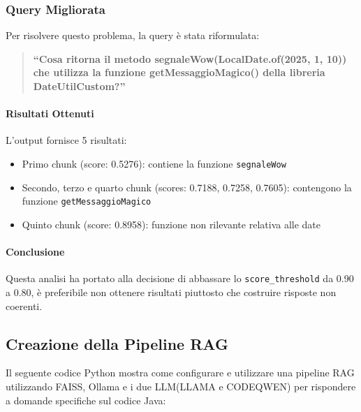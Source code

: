 \documentclass[12pt,a4paper,openright,twoside]{book}
\begin{document}
\subsubsection{Query Migliorata}
Per risolvere questo problema, la query è stata riformulata:
\begin{quote}
    \textbf{``Cosa ritorna il metodo segnaleWow(LocalDate.of(2025, 1, 10)) che utilizza la funzione getMessaggioMagico() della libreria DateUtilCustom?''}
\end{quote}

\paragraph{Risultati Ottenuti}
L'output fornisce 5 risultati:
\begin{itemize}
    \item Primo chunk (score: 0.5276): contiene la funzione \texttt{segnaleWow}
    \item Secondo, terzo e quarto chunk (scores: 0.7188, 0.7258, 0.7605): contengono la funzione \texttt{getMessaggioMagico}
    \item Quinto chunk (score: 0.8958): funzione non rilevante relativa alle date
\end{itemize}

\paragraph{Conclusione}
Questa analisi ha portato alla decisione di abbassare lo \texttt{score\_threshold} da 0.90 a 0.80,
è preferibile non ottenere risultati piuttosto che costruire risposte non coerenti.
 
\subsection{Creazione della Pipeline RAG}
Il seguente codice Python mostra come configurare e utilizzare una pipeline RAG utilizzando FAISS, Ollama e i due LLM(LLAMA e CODEQWEN) per rispondere a domande specifiche sul codice Java:
\end{document}

